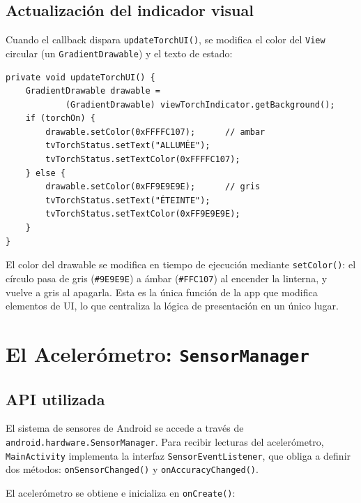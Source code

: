 \documentclass[12pt, a4paper]{article}
\begin{document}
\subsection{Actualizaci\'on del indicador visual}

Cuando el callback dispara \texttt{updateTorchUI()}, se modifica el color del
\texttt{View} circular (un \texttt{GradientDrawable}) y el texto de estado:

\begin{lstlisting}[caption={Actualizaci\'on del indicador de estado --- \texttt{MainActivity.java}}]
private void updateTorchUI() {
    GradientDrawable drawable =
            (GradientDrawable) viewTorchIndicator.getBackground();
    if (torchOn) {
        drawable.setColor(0xFFFFC107);      // ambar
        tvTorchStatus.setText("ALLUMÉE");
        tvTorchStatus.setTextColor(0xFFFFC107);
    } else {
        drawable.setColor(0xFF9E9E9E);      // gris
        tvTorchStatus.setText("ÉTEINTE");
        tvTorchStatus.setTextColor(0xFF9E9E9E);
    }
}
\end{lstlisting}

El color del drawable se modifica en tiempo de ejecuci\'on mediante
\texttt{setColor()}: el c\'irculo pasa de gris (\texttt{\#9E9E9E}) a \'ambar
(\texttt{\#FFC107}) al encender la linterna, y vuelve a gris al apagarla.
Esta es la \'unica funci\'on de la app que modifica elementos de UI, lo que
centraliza la l\'ogica de presentaci\'on en un \'unico lugar.

\section{El Aceler\'ometro: \texttt{SensorManager}}

\subsection{API utilizada}

El sistema de sensores de Android se accede a trav\'es de
\texttt{android.hardware.SensorManager}. Para recibir lecturas del
aceler\'ometro, \texttt{MainActivity} implementa la interfaz
\texttt{SensorEventListener}, que obliga a definir dos m\'etodos:
\texttt{onSensorChanged()} y \texttt{onAccuracyChanged()}.

El aceler\'ometro se obtiene e inicializa en \texttt{onCreate()}:
\end{document}
